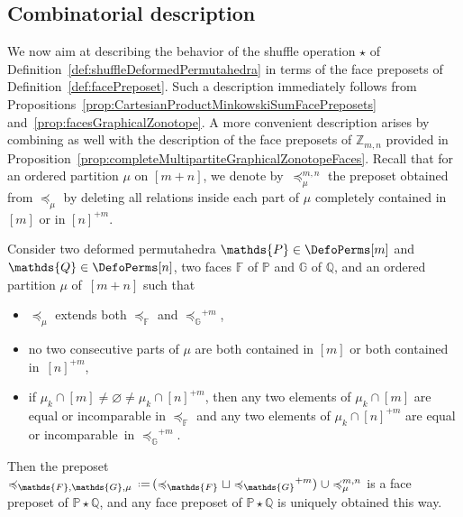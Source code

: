 \documentclass[AHL,Unicode,longabstracts,published]{cedram}
\newcommand{\eqdef}{\mbox{\,\raisebox{0.2ex}{\scriptsize\ensuremath{\mathrm:}}\ensuremath{=}\,}}
\newcommand{\shuffleDP}{\star} %
\newcommand{\polytope}[1]{\mathds{#1}}
\begin{document}
\subsection{Combinatorial description}\label{subsec:combinatorialDescription}

We now aim at describing the behavior of the shuffle operation $\shuffleDP$ of Definition~\ref{def:shuffleDeformedPermutahedra} in terms of the face preposets of Definition~\ref{def:facePreposet}. Such a description immediately follows from Propositions~\ref{prop:CartesianProductMinkowskiSumFacePreposets} and~\ref{prop:facesGraphicalZonotope}. A more convenient description arises by combining as well with the description of the face preposets of $\polytope{Z}_{m,n}$ provided in Proposition~\ref{prop:completeMultipartiteGraphicalZonotopeFaces}. Recall that for an ordered partition $\mu$ on $[m+n]$, we denote by~$\preccurlyeq_\mu^{m,n}$ the preposet obtained from $\preccurlyeq_\mu$ by deleting all relations inside each part of $\mu$ completely contained in $[m]$ or in $[n]^{+m}$.

\begin{prop}\label{prop:shuffleFacePreposets}
Consider two deformed permutahedra $\polytope{P} \in \DefoPerms[m]$ \linebreak and $\polytope{Q} \in \DefoPerms[n]$, two faces $\polytope{F}$ of $\polytope{P}$ and $\polytope{G}$ of $\polytope{Q}$, and an ordered partition $\mu$ of~$[m+n]$ such that
\begin{itemize}
\item $\preccurlyeq_\mu$ extends both $\preccurlyeq_\polytope{F}$ and ${\preccurlyeq_\polytope{G}}^{+m}$,
\item no two consecutive parts of $\mu$ are both contained in $[m]$ or both contained in~$[n]^{+m}$,
\item if $\mu_k \cap [m] \ne \varnothing \ne \mu_k \cap [n]^{+m}$, then any two elements of $\mu_k \cap [m]$ are equal or incomparable in $\preccurlyeq_\polytope{F}$ and any two elements of $\mu_k \cap [n]^{+m}$ are equal or incomparable~in ${\preccurlyeq_\polytope{G}}^{+m}$.
\end{itemize}
Then the preposet $\preccurlyeq_{\polytope{F}, \polytope{G}, \mu} \eqdef (\preccurlyeq_\polytope{F} \sqcup \; {\preccurlyeq_\polytope{G}}^{+m}) \; \cup \preccurlyeq_\mu^{m,n}$ is a face preposet of $\polytope{P} \shuffleDP \polytope{Q}$, and any face preposet of $\polytope{P} \shuffleDP \polytope{Q}$ is uniquely obtained this way.
\end{prop}
\end{document}
